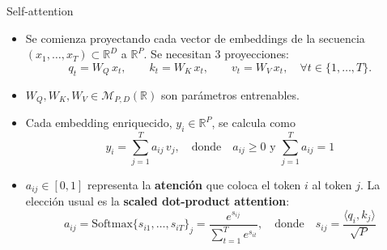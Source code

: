 \documentclass{beamer}
\newcommand{\R}{\mathbb{R}}
\begin{document}
\begin{frame}{Self-attention}
    \begin{itemize}
        \item Se comienza proyectando cada vector de embeddings de la secuencia $(x_1,\ldots,x_T)\subset\R^D$ a $\R^P$.
              Se necesitan 3 proyecciones:
              \begin{equation*}
                  q_t=W_Q\,x_t,
                  \qquad
                  k_t=W_K\,x_t,
                  \qquad
                  v_t=W_V\,x_t,
                  \quad\forall t\in\{1,\ldots,T\}.
              \end{equation*}
        \item $W_Q,W_K,W_V\in\mathcal{M}_{P,D}(\R)$ son parámetros entrenables.
        \item Cada embedding enriquecido, $y_i\in\R^P$, se calcula como
              \begin{equation*}
                  y_i=\sum_{j=1}^T a_{ij}\,v_j,
                  \quad\text{donde}\quad  a_{ij}\geq 0 \text{ y } \sum_{j=1}^T a_{ij}=1
              \end{equation*}
        \item $a_{ij}\in[0,1]$ representa la \textbf{atención} que coloca el token $i$ al token $j$. La elección usual es la \textbf{scaled dot-product attention}:
              \begin{equation*}
                  a_{ij} = \text{Softmax}\{s_{i1},\ldots,s_{iT}\}_j = \frac{e^{s_{ij}}}{\sum_{t=1}^T e^{s_{it}}},
                  \quad\text{donde}\quad
                  s_{ij}=\frac{\langle q_i,k_j\rangle}{\sqrt{P}}
              \end{equation*}
    \end{itemize}
\end{frame}
\end{document}
